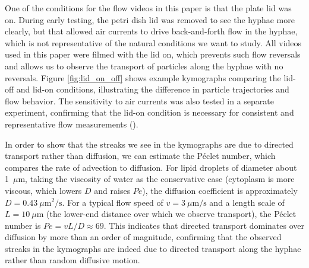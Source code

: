 One of the conditions for the flow videos in this paper is that the plate lid was on. During early testing, the petri dish lid was removed to see the hyphae more clearly, but that allowed air currents to drive back-and-forth flow in the hyphae, which is not representative of the natural conditions we want to study. All videos used in this paper were filmed with the lid on, which prevents such flow reversals and allows us to observe the transport of particles along the hyphae with no reversals. Figure \ref{fig:lid_on_off} shows example kymographs comparing the lid-off and lid-on conditions, illustrating the difference in particle trajectories and flow behavior. The sensitivity to air currents was also tested in a separate experiment, confirming that the lid-on condition is necessary for consistent and representative flow measurements ().

In order to show that the streaks we see in the kymographs are due to directed transport rather than diffusion, we can estimate the P\'eclet number, which compares the rate of advection to diffusion. For lipid droplets of diameter about 1~$\mu$m, taking the viscosity of water as the conservative case (cytoplasm is more viscous, which lowers $D$ and raises $Pe$), the diffusion coefficient is approximately $D = 0.43~\mu\text{m}^2/\text{s}$. For a typical flow speed of $v = 3~\mu\text{m/s}$ and a length scale of $L = 10~\mu$m (the lower-end distance over which we observe transport), the P\'eclet number is $Pe = v L / D \approx 69$. This indicates that directed transport dominates over diffusion by more than an order of magnitude, confirming that the observed streaks in the kymographs are indeed due to directed transport along the hyphae rather than random diffusive motion.

